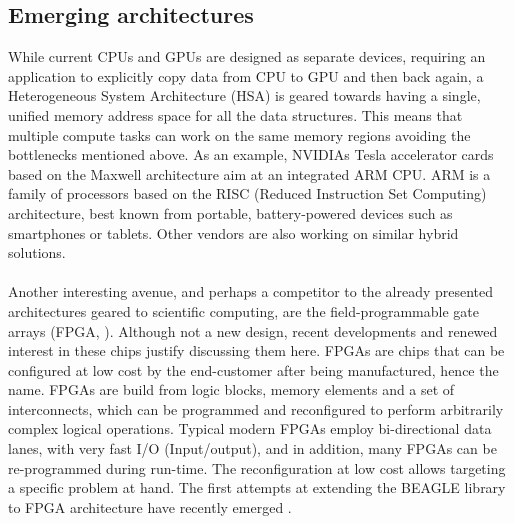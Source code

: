 \subsection{Emerging architectures}

While current CPUs and GPUs are designed as separate devices, requiring an application to explicitly copy data from CPU to GPU and then back again, a Heterogeneous System Architecture (HSA) is geared towards having a single, unified memory address space for all the data structures.
This means that multiple compute tasks can work on the same memory regions avoiding the bottlenecks mentioned above.
As an example, NVIDIAs Tesla accelerator cards based on the Maxwell architecture aim at an integrated ARM CPU. %
ARM is a family of processors based on the RISC (Reduced Instruction Set Computing) architecture, best known from portable, battery-powered devices such as smartphones or tablets. 
Other vendors are also working on similar hybrid solutions.

\paragraph{}
Another interesting avenue, and perhaps a competitor to the already presented architectures geared to scientific computing, are the field-programmable gate arrays (FPGA, \citet{Kuon2008}).
Although not a new design, recent developments and renewed interest in these chips justify discussing them here.
FPGAs are chips that can be configured at low cost by the end-customer after being manufactured, hence the name.
FPGAs are build from logic blocks, memory elements and a set of interconnects, which can be programmed and reconfigured to perform arbitrarily complex logical operations.
Typical modern FPGAs employ bi-directional data lanes, with very fast I/O (Input/output), and in addition, many FPGAs can be re-programmed during run-time. 
%
%
The reconfiguration at low cost allows targeting a specific problem at hand.
The first attempts at extending the BEAGLE library to FPGA architecture have recently emerged \citep{Jin2013}.

